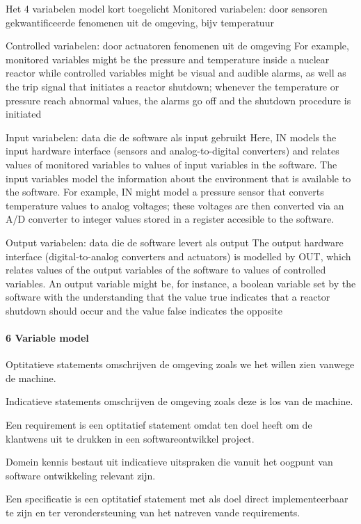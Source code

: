 Het 4 variabelen model kort toegelicht
Monitored variabelen: door sensoren gekwantificeerde fenomenen uit de omgeving, bijv temperatuur

Controlled variabelen: door actuatoren \bestuurde fenomenen uit de omgeving
For example, monitored variables might be the pressure and temperature
inside a nuclear reactor while controlled variables might be visual and audible alarms, as well
as the trip signal that initiates a reactor shutdown; whenever the temperature or pressure reach
abnormal values, the alarms go off and the shutdown procedure is initiated

Input variabelen: data die de software als input gebruikt
Here, IN models the input hardware interface (sensors and analog-to-digital converters) and
relates values of monitored variables to values of input variables in the software. The input variables model the information about the environment that is available to the software. For example,
IN might model a pressure sensor that converts temperature values to analog voltages; these voltages are then converted via an A/D converter to integer values stored in a register accesible to the
software.

Output variabelen: data die de software levert als output
The output hardware interface (digital-to-analog converters and actuators) is modelled
by OUT, which relates values of the output variables of the software to values of controlled variables. An output variable might be, for instance, a boolean variable set by the software with the
understanding that the value true indicates that a reactor shutdown should occur and the value
false indicates the opposite



\paragraph{6 Variable model}
Optitatieve statements omschrijven de omgeving zoals we het willen zien vanwege de machine. 

Indicatieve statements omschrijven de omgeving zoals deze is los van de machine. 

Een requirement is een optitatief statement omdat ten doel heeft om de klantwens uit te drukken in een softwareontwikkel project. 

Domein kennis bestaut uit indicatieve uitspraken die vanuit het oogpunt van software ontwikkeling relevant zijn. 

Een specificatie is een optitatief statement met als doel direct implementeerbaar te zijn en ter verondersteuning van het natreven vande requirements. 


